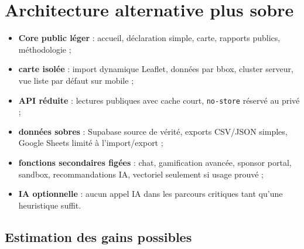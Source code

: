 \documentclass[
  10pt,
  a4paper,
  DIV=11,
  numbers=noendperiod,
  oneside]{scrreprt}
\providecommand{\tightlist}{%
  \setlength{\itemsep}{0pt}\setlength{\parskip}{0pt}}
\let\oldtextbf\textbf
\renewcommand{\textbf}[1]{\oldtextbf{\textcolor{cmmnavy}{#1}}}
\begin{document}
\section{Architecture alternative plus
sobre}\label{architecture-alternative-plus-sobre}

\begin{itemize}
\tightlist
\item
  \textbf{Core public léger} : accueil, déclaration simple, carte,
  rapports publics, méthodologie ;
\item
  \textbf{carte isolée} : import dynamique Leaflet, données par bbox,
  cluster serveur, vue liste par défaut sur mobile ;
\item
  \textbf{API réduite} : lectures publiques avec cache court,
  \texttt{no-store} réservé au privé ;
\item
  \textbf{données sobres} : Supabase source de vérité, exports CSV/JSON
  simples, Google Sheets limité à l'import/export ;
\item
  \textbf{fonctions secondaires figées} : chat, gamification avancée,
  sponsor portal, sandbox, recommandations IA, vectoriel seulement si
  usage prouvé ;
\item
  \textbf{IA optionnelle} : aucun appel IA dans les parcours critiques
  tant qu'une heuristique suffit.
\end{itemize}

\subsection{Estimation des gains
possibles}\label{estimation-des-gains-possibles}
\end{document}
